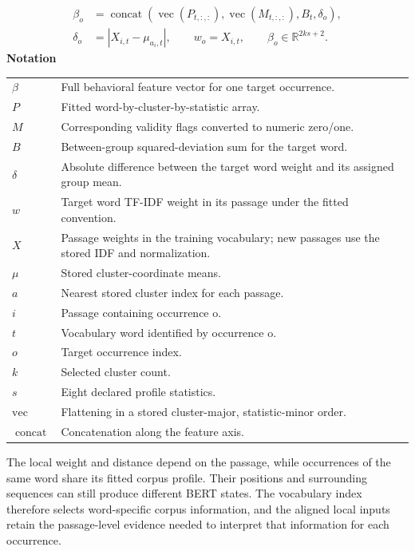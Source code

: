 \documentclass[10pt,letterpaper]{article}
\newcommand{\notlabel}{\noindent\textbf{Notation}\par\nobreak\vspace{4pt}}
\begin{document}
\par\noindent\begin{minipage}{\linewidth}
\begin{equation}\label{eq:behaviorchannel}
\begin{aligned}\beta_o&=\operatorname{concat}\!\left(\operatorname{vec}(P_{t,:,:}),\operatorname{vec}(M_{t,:,:}),B_t,\delta_o\right),\\\delta_o&=|X_{i,t}-\mu_{a_i,t}|,\qquad w_o=X_{i,t},\qquad\beta_o\in\mathbb R^{2ks+2}.\end{aligned}
\end{equation}
\notlabel
{\fontsize{8.5}{10.5}\selectfont\setlength{\tabcolsep}{0pt}\renewcommand{\arraystretch}{1.12}
\begin{tabularx}{\linewidth}{@{}p{.14\linewidth}X@{}}
$\beta$ & Full behavioral feature vector for one target occurrence.\\
$P$ & Fitted word-by-cluster-by-statistic array.\\
$M$ & Corresponding validity flags converted to numeric zero/one.\\
$B$ & Between-group squared-deviation sum for the target word.\\
$\delta$ & Absolute difference between the target word weight and its assigned group mean.\\
$w$ & Target word TF-IDF weight in its passage under the fitted convention.\\
$X$ & Passage weights in the training vocabulary; new passages use the stored IDF and normalization.\\
$\mu$ & Stored cluster-coordinate means.\\
$a$ & Nearest stored cluster index for each passage.\\
$i$ & Passage containing occurrence o.\\
$t$ & Vocabulary word identified by occurrence o.\\
$o$ & Target occurrence index.\\
$k$ & Selected cluster count.\\
$s$ & Eight declared profile statistics.\\
$\mathrm{vec}$ & Flattening in a stored cluster-major, statistic-minor order.\\
$\operatorname{concat}$ & Concatenation along the feature axis.\\
\end{tabularx}}
\par\vspace{2pt}
\end{minipage}\par
The local weight and distance depend on the passage, while occurrences of the same word share its fitted corpus profile. Their positions and surrounding sequences can still produce different BERT states. The vocabulary index therefore selects word-specific corpus information, and the aligned local inputs retain the passage-level evidence needed to interpret that information for each occurrence.\par
\end{document}
